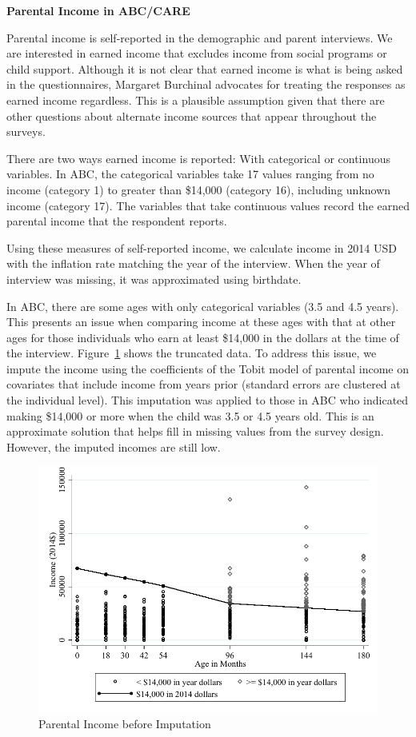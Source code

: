 \documentclass{article}
\begin{document}
\noindent \large{\textbf{Parental Income in ABC/CARE}} \\

\doublespacing

Parental income is self-reported in the demographic and parent interviews. We are interested in earned income that excludes income from social programs or child support. Although it is not clear that earned income is what is being asked in the questionnaires, Margaret Burchinal advocates for treating the responses as earned income regardless. This is a plausible assumption given that there are other questions about alternate income sources that appear throughout the surveys. 

There are two ways earned income is reported: With categorical or continuous variables. In ABC, the categorical variables take 17 values ranging from no income (category 1) to greater than \$14,000 (category 16), including unknown income (category 17). The variables that take continuous values record the earned parental income that the respondent reports.

Using these measures of self-reported income, we calculate income in 2014 USD with the inflation rate matching the year of the interview. When the year of interview was missing, it was approximated using birthdate.

In ABC, there are some ages with only categorical variables (3.5 and 4.5 years). This presents an issue when comparing income at these ages with that at other ages for those individuals who earn at least \$14,000 in the dollars at the time of the interview. Figure~\ref{fig:pinc} shows the truncated data. To address this issue, we impute the income using the coefficients of the Tobit model of parental income on covariates that include income from years prior (standard errors are clustered at the individual level). This imputation was applied to those in ABC who indicated making \$14,000 or more when the child was 3.5 or 4.5 years old. This is an approximate solution that helps fill in missing values from the survey design. However, the imputed incomes are still low.

\begin{figure}
\centering
\caption{Parental Income before Imputation}\label{fig:pinc}
\includegraphics[width=\textwidth]{output/ABC-income-trunc}
\end{figure}
\end{document}
